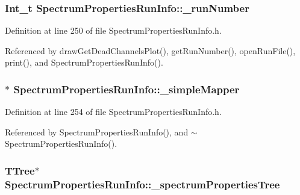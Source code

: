 \hypertarget{class_spectrum_properties_run_info_af3b62d094196da758718fbc1d05eed96}{
\subsubsection[{\-\_\-run\-Number}]{\setlength{\rightskip}{0pt plus 5cm}Int\-\_\-t Spectrum\-Properties\-Run\-Info\-::\-\_\-run\-Number\hspace{0.3cm}{\ttfamily [protected]}}}\label{class_spectrum_properties_run_info_af3b62d094196da758718fbc1d05eed96}


Definition at line 250 of file Spectrum\-Properties\-Run\-Info.\-h.



Referenced by draw\-Get\-Dead\-Channels\-Plot(), get\-Run\-Number(), open\-Run\-File(), print(), and Spectrum\-Properties\-Run\-Info().

\hypertarget{class_spectrum_properties_run_info_a1a2747ac99761940eb128ca041014dc2}{
\subsubsection[{\-\_\-simple\-Mapper}]{$\ast$ Spectrum\-Properties\-Run\-Info\-::\-\_\-simple\-Mapper\hspace{0.3cm}{\ttfamily [protected]}}}\label{class_spectrum_properties_run_info_a1a2747ac99761940eb128ca041014dc2}


Definition at line 254 of file Spectrum\-Properties\-Run\-Info.\-h.



Referenced by Spectrum\-Properties\-Run\-Info(), and $\sim$\-Spectrum\-Properties\-Run\-Info().

\hypertarget{class_spectrum_properties_run_info_ae3cb4e7dd3f4d8fc02094738ba60cfca}{
\subsubsection[{\-\_\-spectrum\-Properties\-Tree}]{\setlength{\rightskip}{0pt plus 5cm}T\-Tree$\ast$ Spectrum\-Properties\-Run\-Info\-::\-\_\-spectrum\-Properties\-Tree\hspace{0.3cm}{\ttfamily [protected]}}}\label{class_spectrum_properties_run_info_ae3cb4e7dd3f4d8fc02094738ba60cfca}


